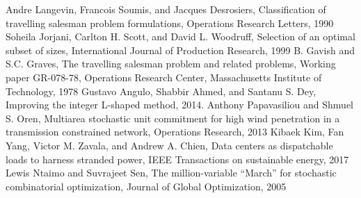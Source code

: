 \begin{thebibliography}{9}
	Andre Langevin, Francois Soumis, and Jacques Desrosiers, Classification of travelling salesman problem formulations, Operations Research Letters, 1990
	Soheila Jorjani, Carlton H. Scott, and David L. Woodruff, Selection of an optimal subset of sizes, International Journal of Production Research, 1999	
	B. Gavish and S.C. Graves, The travelling salesman problem and related problems, Working paper GR-078-78, Operations Research Center, Massachusetts Institute of Technology, 1978
	Gustavo Angulo, Shabbir Ahmed, and Santanu S. Dey, Improving the integer L-shaped method, 2014.
	Anthony Papavasiliou and Shmuel S. Oren, Multiarea stochastic unit commitment for high wind penetration in a transmission constrained network, Operations Research, 2013
	Kibaek Kim, Fan Yang, Victor M. Zavala, and Andrew A. Chien, Data centers as dispatchable loads to harness stranded power, IEEE Transactions on sustainable energy, 2017
	Lewis Ntaimo and Suvrajeet Sen, The million-variable ``March'' for stochastic combinatorial optimization, Journal of Global Optimization, 2005
\end{thebibliography}


